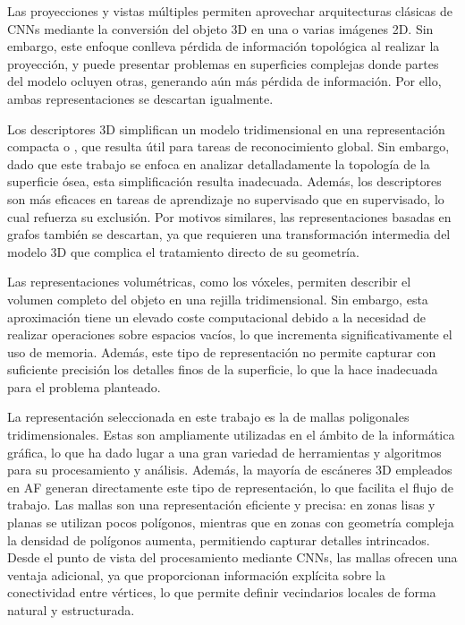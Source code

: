 Las proyecciones y vistas múltiples permiten aprovechar arquitecturas clásicas de CNNs mediante la conversión del objeto 3D en una o varias imágenes 2D. Sin embargo, este enfoque conlleva pérdida de información topológica al realizar la proyección, y puede presentar problemas en superficies complejas donde partes del modelo ocluyen otras, generando aún más pérdida de información. Por ello, ambas representaciones se descartan igualmente.

Los descriptores 3D simplifican un modelo tridimensional en una representación compacta o , que resulta útil para tareas de reconocimiento global. Sin embargo, dado que este trabajo se enfoca en analizar detalladamente la topología de la superficie ósea, esta simplificación resulta inadecuada. Además, los descriptores son más eficaces en tareas de aprendizaje no supervisado que en supervisado, lo cual refuerza su exclusión. Por motivos similares, las representaciones basadas en grafos también se descartan, ya que requieren una transformación intermedia del modelo 3D que complica el tratamiento directo de su geometría.

Las representaciones volumétricas, como los vóxeles, permiten describir el volumen completo del objeto en una rejilla tridimensional. Sin embargo, esta aproximación tiene un elevado coste computacional debido a la necesidad de realizar operaciones sobre espacios vacíos, lo que incrementa significativamente el uso de memoria. Además, este tipo de representación no permite capturar con suficiente precisión los detalles finos de la superficie, lo que la hace inadecuada para el problema planteado.

La representación seleccionada en este trabajo es la de mallas poligonales tridimensionales. Estas son ampliamente utilizadas en el ámbito de la informática gráfica, lo que ha dado lugar a una gran variedad de herramientas y algoritmos para su procesamiento y análisis. Además, la mayoría de escáneres 3D empleados en AF generan directamente este tipo de representación, lo que facilita el flujo de trabajo. Las mallas son una representación eficiente y precisa: en zonas lisas y planas se utilizan pocos polígonos, mientras que en zonas con geometría compleja la densidad de polígonos aumenta, permitiendo capturar detalles intrincados. Desde el punto de vista del procesamiento mediante CNNs, las mallas ofrecen una ventaja adicional, ya que proporcionan información explícita sobre la conectividad entre vértices, lo que permite definir vecindarios locales de forma natural y estructurada.

